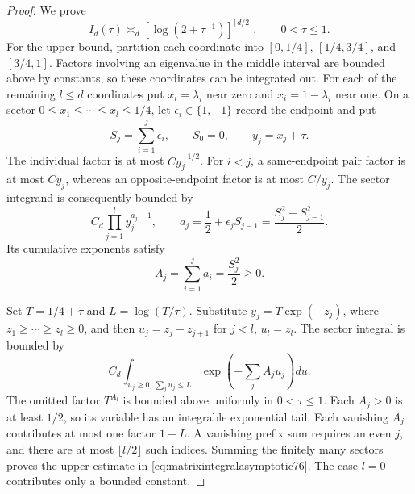 \begin{proof}
We prove
\begin{equation}\label{eq:matrixintegralasymptotic76}
 I_d(\tau)\asymp_d
       [\log(2+\tau^{-1})]^{\lfloor d/2\rfloor},
                       \qquad0<\tau\le1.
\end{equation}
For the upper bound, partition each coordinate into
$[0,1/4]$, $[1/4,3/4]$, and $[3/4,1]$.
Factors involving an eigenvalue in the middle interval are bounded
above by constants, so these coordinates can be integrated out.
For each of the remaining $l\le d$ coordinates put $x_i=\lambda_i$
near zero and $x_i=1-\lambda_i$ near one. On a sector
$0\le x_1\le\cdots\le x_l\le1/4$, let
$\epsilon_i\in\{1,-1\}$ record the endpoint and put
\[
 S_j=\sum_{i=1}^j\epsilon_i,\qquad S_0=0,\qquad y_j=x_j+\tau.
\]
The individual factor is at most $Cy_j^{-1/2}$. For $i<j$, a
same-endpoint pair factor is at most $Cy_j$, whereas an
opposite-endpoint factor is at most $C/y_j$. The sector integrand
is consequently bounded by
\begin{equation}\label{eq:matrixsector76}
 C_d\prod_{j=1}^ly_j^{a_j-1},\qquad
 a_j=\frac12+\epsilon_jS_{j-1}
              =\frac{S_j^2-S_{j-1}^2}{2}.
\end{equation}
Its cumulative exponents satisfy
\begin{equation}\label{eq:matrixprefix76}
 A_j=\sum_{i=1}^ja_i=\frac{S_j^2}{2}\ge0.
\end{equation}

Set $T=1/4+\tau$ and $L=\log(T/\tau)$. Substitute
$y_j=T\exp(-z_j)$, where $z_1\ge\cdots\ge z_l\ge0$,
and then $u_j=z_j-z_{j+1}$ for $j<l$, $u_l=z_l$.
The sector integral is bounded by
\begin{equation}\label{eq:matrixprefixintegral76}
 C_d\int_{u_j\ge0,\,\sum_j u_j\le L}
              \exp\left(-\sum_jA_ju_j\right)du.
\end{equation}
The omitted factor $T^{A_l}$ is bounded above uniformly in
$0<\tau\le1$. Each $A_j>0$ is at least $1/2$, so its variable has
an integrable exponential tail. Each vanishing $A_j$ contributes
at most one factor $1+L$. A vanishing prefix sum requires an even
$j$, and there are at most $\lfloor l/2\rfloor$ such indices.
Summing the finitely many sectors proves the upper estimate in
\eqref{eq:matrixintegralasymptotic76}. The case $l=0$ contributes
only a bounded constant.


\end{proof}

